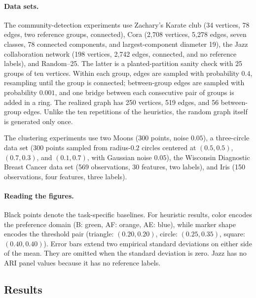 \paragraph{Data sets.}
The community-detection experiments use Zachary's Karate club
\cite{konect:2017:zachary-karate-club,zac:j:information-flow-model-conflict-fission-small-groups}
(34 vertices, 78 edges, two reference groups, connected), Cora
\cite{mcc-nig-ren-sey:j:cora,ieeedataport:cora}
(2,708 vertices, 5,278 edges, seven classes, 78 connected components, and
largest-component diameter 19), the Jazz collaboration network
\cite{konect:arenas-jazz,konect:2017:arenas-jazz}
(198 vertices, 2,742 edges, connected, and no reference labels), and
Random--25.  The latter
is a planted-partition sanity check with 25 groups of ten vertices.  Within
each group, edges are sampled with probability \(0.4\), resampling until the
group is connected; between-group edges are sampled with probability \(0.001\),
and one bridge between each consecutive pair of groups is added in a ring.
The realized graph has 250 vertices, 519 edges, and 56 between-group edges.
Unlike the ten repetitions of the heuristics, the random graph itself is
generated only once.

The clustering experiments use two Moons (300 points, noise \(0.05\)), a
three-circle data set (300 points sampled from radius-\(0.2\) circles centered
at \((0.5,0.5)\), \((0.7,0.3)\), and \((0.1,0.7)\), with Gaussian noise
\(0.05\)), the Wisconsin Diagnostic Breast Cancer data set
\cite{breast_cancer_wisconsin,scikit-learn}
(569 observations, 30 features, two labels), and Iris
\cite{fisher1936use,scikit-learn}
(150 observations, four features, three labels).

\paragraph{Reading the figures.}
Black points denote the task-specific baselines.  For heuristic results, color
encodes the preference domain (B: green, AF: orange, AE: blue), while marker
shape encodes the threshold pair (triangle:
\((0.20,0.20)\), circle: \((0.25,0.35)\), square:
\((0.40,0.40)\)).  Error bars extend two empirical standard deviations on
either side of the mean.  They are omitted when the standard deviation is zero.
Jazz has no ARI panel values because it has no reference labels.

\subsection{Results}
\label{sec:sim-results}

